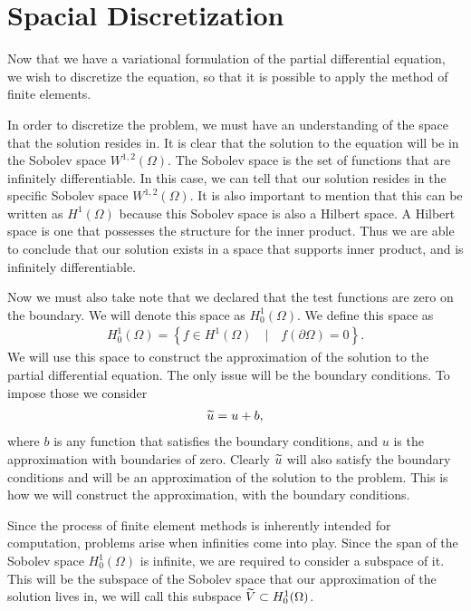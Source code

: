 \documentclass[../fem.tex]{subfile}
\begin{document}
\section{Spacial Discretization}%
\label{sec:spacial_discretization}

Now that we have a variational formulation of the partial differential
equation, we wish to discretize the equation, so that it is possible to apply
the method of finite elements.

In order to discretize the problem, we must have an understanding of the space
that the solution resides in. It is clear that the solution to the equation
will be in the Sobolev space $W^{1,2}(\Omega)$. The Sobolev space is the set of
functions that are infinitely differentiable. In this case, we can tell
that our solution resides in the specific Sobolev space $W^{1,2}(\Omega)$. It
is also important to mention that this can be written as $H^1(\Omega)$ because
this Sobolev space is also a Hilbert space. A Hilbert space is one that possesses
the structure for the inner product. Thus we are able to conclude that our solution
exists in a space that supports inner product, and is infinitely
differentiable.

Now we must also take note that we declared that the test functions are zero on
the boundary. We will denote this space as $H^1_0(\Omega)$. We define this
space as
\begin{align*}
  H^1_0(\Omega)=\left\{f\in H^1(\Omega)\quad \vert\quad
  f(\partial\Omega)=0\right\}.
\end{align*}
We will use this space to construct the approximation of the solution to the
partial differential equation. The only issue will be the boundary conditions.
To impose those we consider
\begin{align*}
  \widetilde{u}=u+b,
\end{align*}
where $b$ is any function that satisfies the boundary conditions, and $u$ is
the approximation with boundaries of zero. Clearly $\widetilde{u}$ will also satisfy
the boundary conditions and will be an approximation of the solution to the
problem. This is how we will construct the approximation, with the boundary
conditions.

Since the process of finite element methods is inherently intended for
computation, problems arise when infinities come into play. Since the span of
the Sobolev space $H^1_0(\Omega)$ is infinite, we are required to consider a
subspace of it. This will be the subspace of the Sobolev space that our
approximation of the solution lives in, we will call this subspace
$\widetilde{V}\subset H^1_0(\Omega)$.
\end{document}

